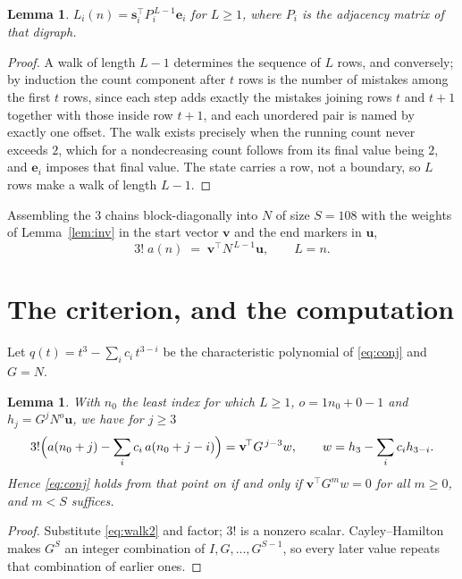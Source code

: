 \documentclass[11pt,a4paper]{article}
\theoremstyle{plain}
\newtheorem{lemma}[theorem]{Lemma}
\theoremstyle{definition}
\begin{document}
\begin{lemma}\label{lem:walk}
$L_i(n)=\mathbf{s}_i^{\!\top}P_i^{\,L-1}\mathbf{e}_i$ for $L\ge1$, where $P_i$ is the
adjacency matrix of that digraph.
\end{lemma}

\begin{proof}
A walk of length $L-1$ determines the sequence of $L$ rows, and conversely; by induction
the count component after $t$ rows is the number of mistakes among the first $t$ rows,
since each step adds exactly the mistakes joining rows $t$ and $t+1$ together with those
inside row $t+1$, and each unordered pair is named by exactly one offset. The walk exists
precisely when the running count never exceeds $2$, which for a nondecreasing count follows
from its final value being $2$, and $\mathbf{e}_i$ imposes that final value. The state
carries a row, not a boundary, so $L$ rows make a walk of length $L-1$.
\end{proof}

Assembling the $3$ chains block-diagonally into $N$ of size $S=108$ with the weights of
Lemma~\ref{lem:inv} in the start vector $\mathbf{v}$ and the end markers in
$\mathbf{u}$,
\begin{equation}\label{eq:walk2}
3!\;a(n)\;=\;\mathbf{v}^{\!\top}N^{\,L-1}\mathbf{u},\qquad L=n .
\end{equation}

\section{The criterion, and the computation}

Let $q(t)=t^{3}-\sum_i c_i\,t^{3-i}$ be the characteristic polynomial of
\eqref{eq:conj} and $G=N$.

\begin{lemma}\label{lem:crit}
With $n_0$ the least index for which $L\ge1$, $o=1n_0+0-1$ and
$h_j=G^{j}N^{o}\mathbf{u}$, we have for $j\ge3$
\[
3!\Bigl(a(n_0+j)-\sum_i c_i\,a(n_0+j-i)\Bigr)=\mathbf{v}^{\!\top}G^{\,j-3}w,
\qquad w=h_{3}-\sum_i c_ih_{3-i} .
\]
Hence \eqref{eq:conj} holds from that point on if and only if
$\mathbf{v}^{\!\top}G^{m}w=0$ for all $m\ge0$, and $m<S$ suffices.
\end{lemma}

\begin{proof}
Substitute \eqref{eq:walk2} and factor; $3!$ is a nonzero scalar. Cayley--Hamilton
makes $G^{S}$ an integer combination of $I,G,\dots,G^{S-1}$, so every later value repeats
that combination of earlier ones.
\end{proof}
\end{document}
